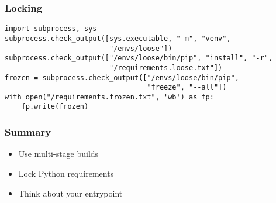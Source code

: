 \documentclass{beamer}
\begin{document}
\begin{frame}[fragile]
\frametitle{Locking}
\begin{lstlisting}
import subprocess, sys
subprocess.check_output([sys.executable, "-m", "venv",
                         "/envs/loose"])
subprocess.check_output(["/envs/loose/bin/pip", "install", "-r",
                         "/requirements.loose.txt"])
frozen = subprocess.check_output(["/envs/loose/bin/pip",
                                  "freeze", "--all"])
with open("/requirements.frozen.txt", 'wb') as fp:
    fp.write(frozen)
\end{lstlisting}
\end{frame}

\begin{frame}
\frametitle{Summary}
\begin{itemize}
\item Use multi-stage builds \pause
\item Lock Python requirements \pause
\item Think about your entrypoint
\end{itemize}
\end{frame}
\end{document}
